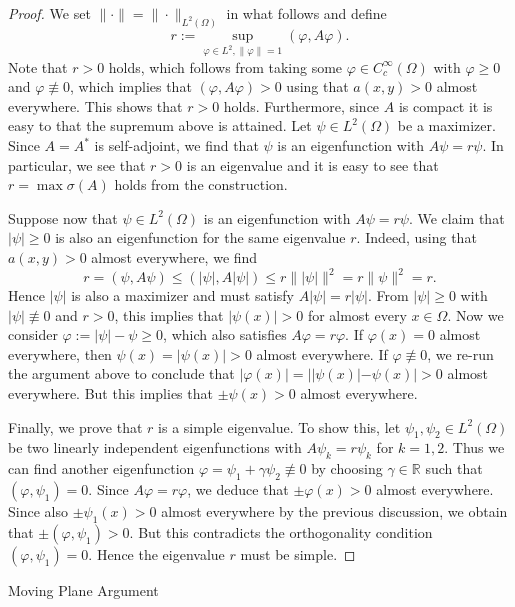 \documentclass[reqno,10pt,a4paper]{amsart}
\makeatletter
\theoremstyle{definition}
\theoremstyle{definition}
\theoremstyle{remark}
\theoremstyle{remark}
\numberwithin{equation}{section}
\newcommand{\R}{\mathbb{R}}
\renewcommand{\phi}{\varphi}
\def\section{\@startsection{section}{1}%
  \z@{1.5\linespacing\@plus\linespacing}{.5\linespacing}%
  {\normalfont\bfseries\large\centering}}
\makeatother
\begin{document}
\begin{appendix}
\begin{proof}
We set $\| \cdot \| = \| \cdot \|_{L^2(\Omega)}$ in what follows and define
$$
r := \sup_{\phi \in L^2, \| \phi \| = 1} (\phi, A \phi) .
$$
Note that $r > 0$ holds, which follows from taking some $\phi \in C^\infty_c(\Omega)$ with $\phi \geq 0$ and $\phi \not \equiv 0$, which implies that $(\phi, A \phi) > 0$ using that $a(x,y) > 0$ almost everywhere. This shows that $r > 0$ holds. Furthermore, since $A$ is compact it is easy to that the supremum above is attained. Let $\psi \in L^2(\Omega)$ be a maximizer. Since $A=A^*$ is self-adjoint, we find that $\psi$ is an eigenfunction with $A \psi = r \psi$. In particular, we see that $r > 0$ is an eigenvalue and it is easy to see that $r = \max \sigma(A)$ holds from the construction.


Suppose now that $\psi \in L^2(\Omega)$ is an eigenfunction with $A \psi = r \psi$. We claim that $|\psi| \geq 0$ is also an eigenfunction for the same eigenvalue $r$. Indeed, using that $a(x,y) > 0$ almost everywhere, we find
$$
 r= (\psi, A \psi) \leq  (|\psi|, A |\psi|) \leq r \| |\psi| \|^2 = r \| \psi \|^2 = r. 
$$ 
Hence $|\psi|$ is also a maximizer and must satisfy $A|\psi| = r |\psi|$. From $|\psi| \geq 0$ with $|\psi| \not \equiv 0$ and $r>0$, this implies that $|\psi(x)| > 0$ for almost every $x \in \Omega$. Now we consider $\phi := |\psi| - \psi \geq 0$, which also satisfies $A \phi = r \phi$. If $\phi(x) = 0$ almost everywhere, then $\psi(x) = |\psi(x)| > 0$ almost everywhere. If $\phi \not \equiv 0$, we re-run the argument above to conclude that $|\phi(x)| = | |\psi(x)| - \psi(x)| > 0$ almost everywhere. But this implies that $\pm \psi(x) >0$ almost everywhere.

Finally, we prove that $r$ is a simple eigenvalue. To show this, let $\psi_1, \psi_2 \in L^2(\Omega)$ be two linearly independent eigenfunctions with $A \psi_k = r \psi_k$ for $k=1,2$. Thus we can find another eigenfunction $\phi = \psi_1 + \gamma \psi_2 \not \equiv 0$ by choosing $\gamma \in \R$ such that $(\phi, \psi_1)=0$. Since $A \phi = r\phi$, we deduce that $\pm \phi(x) > 0$ almost everywhere. Since also $\pm \psi_1(x) > 0$ almost everywhere by the previous discussion, we obtain that $\pm (\phi, \psi_1) > 0$. But this contradicts the orthogonality condition $(\phi, \psi_1) =0$. Hence the eigenvalue $r$ must be simple.
\end{proof}

\section{Moving Plane Argument}


\end{appendix}
\end{document}
